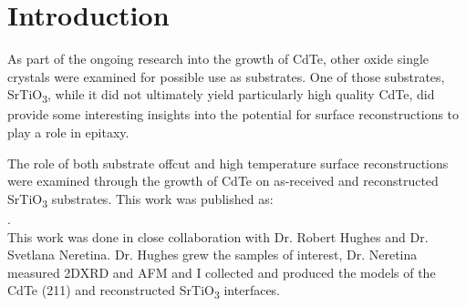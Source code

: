 \section{Introduction}
As part of the ongoing research into the growth of CdTe, other oxide single crystals were examined for possible use as substrates.
One of those substrates, SrTiO\textsubscript{3}, while it did not ultimately yield particularly high quality CdTe, did provide some interesting insights into the potential for surface reconstructions to play a role in epitaxy.

The role of both substrate offcut and high temperature surface reconstructions were examined through the growth of CdTe on as-received and reconstructed SrTiO\textsubscript{3} substrates.
This work was published as:\\
 \cite{Neretina2009a}.\\
This work was done in close collaboration with Dr. Robert Hughes and Dr. Svetlana Neretina. Dr. Hughes grew the samples of interest, Dr. Neretina measured 2DXRD and AFM and I collected and produced the models of the CdTe (211) and reconstructed SrTiO\textsubscript{3} interfaces.
